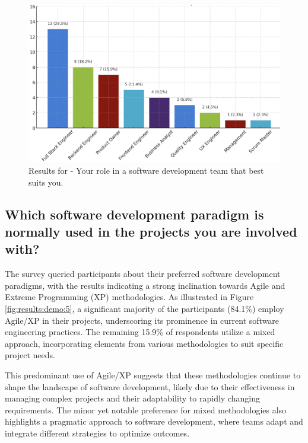 \begin{figure}[h!]
\centering
\includegraphics[width=\linewidth]{Images/Survey/demo_4.png}
\caption{Results for - Your role in a software development team that best suits you.}
\label{fig:results:demo:4}
\end{figure}

\pagebreak

\subsection*{Which software development paradigm is normally used in the projects you are involved with?}

The survey queried participants about their preferred software development paradigms, with the results indicating a strong inclination towards Agile and Extreme Programming (XP) methodologies. As illustrated in Figure \ref{fig:results:demo:5}, a significant majority of the participants (84.1\%) employ Agile/XP in their projects, underscoring its prominence in current software engineering practices. The remaining 15.9\% of respondents utilize a mixed approach, incorporating elements from various methodologies to suit specific project needs.

This predominant use of Agile/XP suggests that these methodologies continue to shape the landscape of software development, likely due to their effectiveness in managing complex projects and their adaptability to rapidly changing requirements. The minor yet notable preference for mixed methodologies also highlights a pragmatic approach to software development, where teams adapt and integrate different strategies to optimize outcomes.


